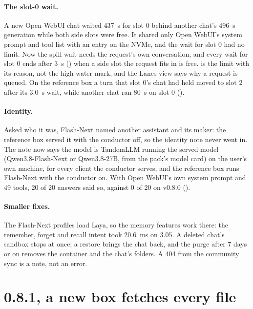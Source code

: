 \paragraph{The slot-0 wait.} A new Open WebUI chat waited 437~s for slot 0 behind another chat's 496~s generation while both side slots were free. It shared only Open WebUI's system prompt and tool list with an entry on the NVMe, and the wait for slot 0 had no limit. Now the spill wait needs the request's own conversation, and every wait for slot 0 ends after 3~s () when a side slot the request fits in is free.   is the limit with its reason, not the high-water mark, and the Lanes view says why a request is queued. On the reference box a turn that slot 0's chat had held moved to slot 2 after its 3.0~s wait, while another chat ran 80~s on slot 0 (\measured).

\paragraph{Identity.} Asked who it was, Flash-Next named another assistant and its maker: the reference box served it with the conductor off, so the identity note never went in. The note now says the model is TandemLLM running the served model (Qwen3.8-Flash-Next or Qwen3.8-27B, from the pack's model card) on the user's own machine, for every client the conductor serves, and the reference box runs Flash-Next with the conductor on. With Open WebUI's own system prompt and 49 tools, 20 of 20 answers said so, against 0 of 20 on v0.8.0 (\measured).

\paragraph{Smaller fixes.} The Flash-Next profiles load Laya, so the memory features work there: the remember, forget and recall intent took 20.6~ms on 3.05. A deleted chat's sandbox stops at once; a restore brings the chat back, and the purge after 7 days or on  removes the container and the chat's folders. A 404 from the community sync is a note, not an error.

\section{0.8.1, a new box fetches every file}

